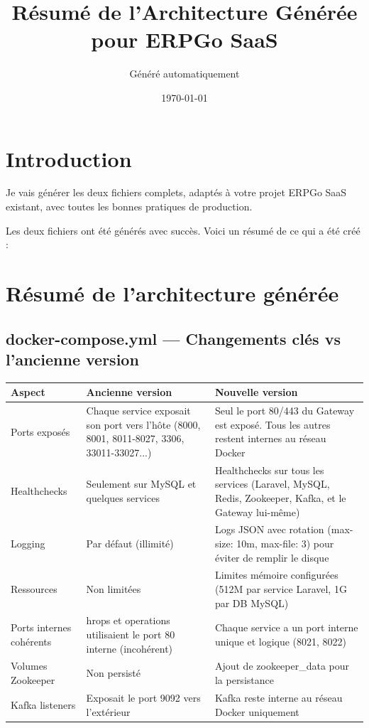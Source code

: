 \documentclass{article}
\title{Résumé de l'Architecture Générée pour ERPGo SaaS}
\author{Généré automatiquement}
\date{\today}
\begin{document}
\maketitle

\section{Introduction}
Je vais générer les deux fichiers complets, adaptés à votre projet ERPGo SaaS existant, avec toutes les bonnes pratiques de production.

Les deux fichiers ont été générés avec succès. Voici un résumé de ce qui a été créé :

\section{Résumé de l'architecture générée}

\subsection{docker-compose.yml — Changements clés vs l'ancienne version}

\begin{longtable}{p{3cm}p{6cm}p{6cm}}
\toprule
\textbf{Aspect} & \textbf{Ancienne version} & \textbf{Nouvelle version} \\
\midrule
Ports exposés & Chaque service exposait son port vers l'hôte (8000, 8001, 8011-8027, 3306, 33011-33027...) & Seul le port 80/443 du Gateway est exposé. Tous les autres restent internes au réseau Docker \\
Healthchecks & Seulement sur MySQL et quelques services & Healthchecks sur tous les services (Laravel, MySQL, Redis, Zookeeper, Kafka, et le Gateway lui-même) \\
Logging & Par défaut (illimité) & Logs JSON avec rotation (max-size: 10m, max-file: 3) pour éviter de remplir le disque \\
Ressources & Non limitées & Limites mémoire configurées (512M par service Laravel, 1G par DB MySQL) \\
Ports internes cohérents & hrops et operations utilisaient le port 80 interne (incohérent) & Chaque service a un port interne unique et logique (8021, 8022) \\
Volumes Zookeeper & Non persisté & Ajout de zookeeper\_data pour la persistance \\
Kafka listeners & Exposait le port 9092 vers l'extérieur & Kafka reste interne au réseau Docker uniquement \\
\bottomrule
\end{longtable}
\end{document}
